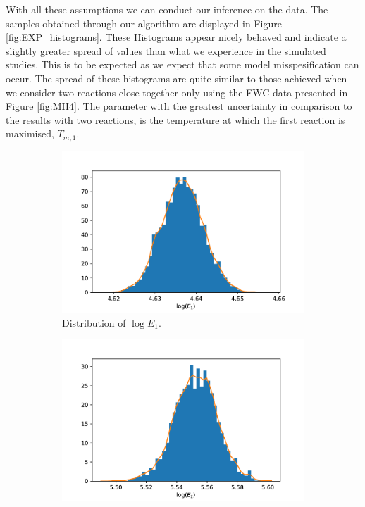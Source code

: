 With all these assumptions we can conduct our inference on the data. The samples obtained through our algorithm are displayed in Figure \ref{fig:EXP_histograms}. These Histograms appear nicely behaved and indicate a slightly greater spread of values than what we experience in the simulated studies. This is to be expected as we expect that some model misspesification can occur. The spread of these histograms are quite similar to those achieved when we consider two reactions close together only using the FWC data presented in Figure \ref{fig:MH4}. The parameter with the greatest uncertainty in comparison to the results with two reactions, is the temperature at which the first reaction is maximised, $T_{m,1}$. 

\begin{figure}[h!]
\centering
\begin{subfigure}{.5\textwidth}
  \centering
  \includegraphics[width=\linewidth]{figures/bayesian/EXP_Q/hist_E1.pdf}  \caption{Distribution of $\log E_1$.}
  \label{fig:subhistE1}
\end{subfigure}%
\begin{subfigure}{.5\textwidth}
  \centering
  \includegraphics[width=\linewidth]{figures/bayesian/EXP_Q/hist_E2.pdf}

\end{subfigure}
\end{figure}
